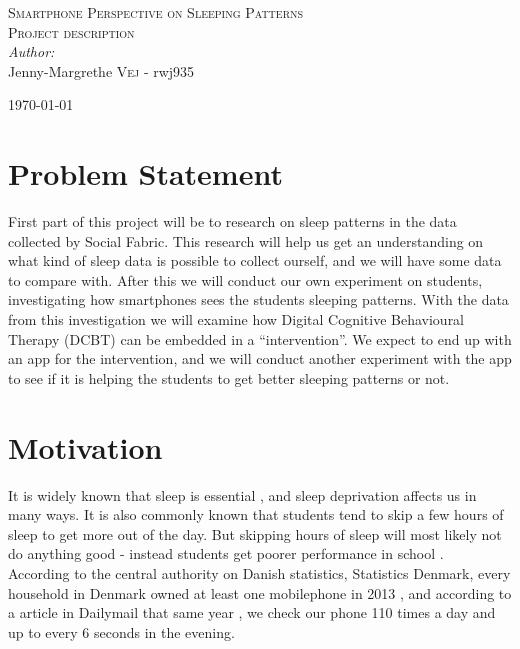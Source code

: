 \documentclass[12pt]{article}
\begin{document}

\begin{center}
\textsc{\Large Smartphone Perspective on Sleeping Patterns}\\[0.5cm] 
\textsc{\large Project description}\\[0.5cm] 


\emph{Author:}
\\
Jenny-Margrethe \textsc{Vej} - rwj935\\ 
\vspace{10mm}

{\large \today}\\[3cm] 
\end{center}
\vspace{-20mm}

\section{Problem Statement}
First part of this project will be to research on sleep patterns in the data collected by Social 
Fabric\cite{Stopczynski2014}. This research will help us get an understanding on what kind of 
sleep data is possible to collect ourself, and we will have some data to compare with. After this 
we will conduct our own experiment on students, investigating how smartphones sees the 
students sleeping patterns. With the data from this investigation we will examine how Digital 
Cognitive Behavioural Therapy (DCBT) can be embedded in a ``intervention''. 
We expect to end up with an app for the intervention, and we will conduct another experiment
with the app to see if it is helping the students to get better sleeping patterns or not. 

\section{Motivation}
It is widely known that sleep is essential \cite{Gumbiner2012}, and sleep deprivation affects 
us in many ways. It is also commonly known that students tend to skip a few hours of sleep to 
get more out of the day. But skipping hours of sleep will most likely not do anything good - instead
students get poorer performance in school \cite{Gilbert2010}. \\

According to the central authority on Danish statistics, Statistics Denmark, every household in 
Denmark owned at least one mobilephone in 2013 \cite{DanmarksStatistik2013}, and according 
to a article in Dailymail that same year \cite{Woollaston2013}, we check our phone 110 times a 
day and up to every 6 seconds in the evening. \\
\end{document}
